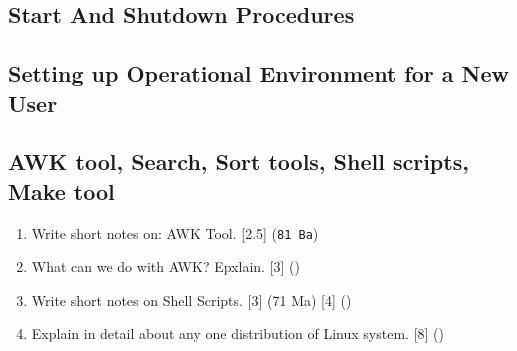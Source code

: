 \documentclass[12pt]{article}
\begin{document}
	\subsection{Start And Shutdown Procedures}
	\subsection{Setting up Operational Environment for a New User}
	\subsection{AWK tool, Search, Sort tools, Shell scripts, Make tool}
		\begin{enumerate}
			\item Write short notes on: AWK Tool. \hfill [2.5] (\texttt{81 Ba})

			\item What can we do with AWK? Epxlain. \hfill [3] ()

			\item Write short notes on Shell Scripts. \hfill [3] (71 Ma) [4] ()

			\item Explain in detail about any one distribution of Linux system. \hfill [8] ()
		\end{enumerate}
\end{document}
